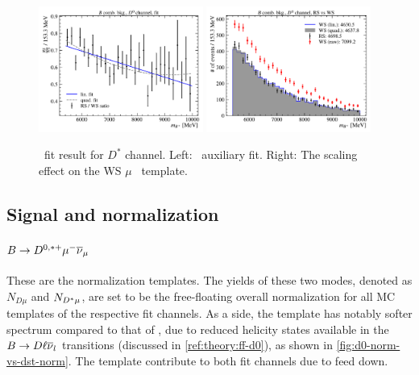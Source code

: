 \begin{figure}[!htb]
    \centering
    \includegraphics[width=0.48\textwidth]{figs-fit-fit-templates/data-driven-plots/b_comb/fit_b_comb_d0_fit.pdf}
    \includegraphics[width=0.48\textwidth]{figs-fit-fit-templates/data-driven-plots/b_comb/fit_b_comb_d0_scaled.pdf}

    \caption{
        \BComb\ fit result for $D^*$ channel.
        Left: \BComb\ auxiliary fit.
        Right: The scaling effect on the WS $\mu$ \BComb\ template.
    }
    \label{fig:b-comb-d0}
\end{figure}


\subsection{Signal and normalization}
\label{tmpl:sig-norm}

\paragraph{$B \rightarrow D^{0,*+}{\mu^-}{{\overline{\nu}}_\mu}$}
These are the normalization templates.
The yields of these two modes, denoted as $N_{D\mu}$ and $N_{{{D}^*}\mu}$,
are set to be the free-floating overall normalization for all MC templates of
the respective fit channels.
As a side, the \Dz\muon template has notably softer \qSq spectrum compared to
that of \Dstar\muon, due to reduced helicity states available in the
$B \rightarrow D \ell {\ensuremath{{\overline{\nu}}_l}}$ transitions
(discussed in \cref{ref:theory:ff-d0}),
as shown in \cref{fig:d0-norm-vs-dst-norm}.
The \Dstarp template contribute to both fit channels due to feed down.

